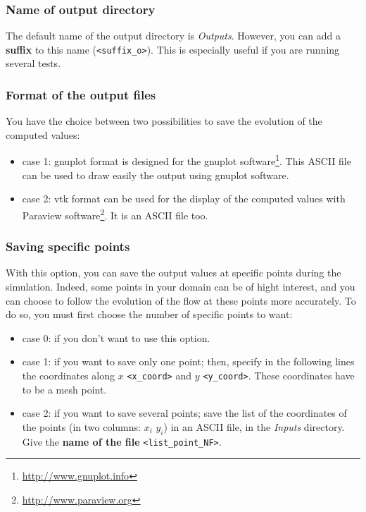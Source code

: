 \documentclass[a4paper, 11pt]{article}
\begin{document}
\subsubsection{Name of output directory}

The default name of the output directory is \textit{Outputs}. However, you can add a \textbf{suffix} to this name (\texttt{<suffix\_o>}). This is especially useful if you are running several tests.

\subsubsection{Format of the output files}
You have the choice between two possibilities to save the evolution of the computed values:
\begin{itemize}
\item case 1: gnuplot format is designed for the gnuplot software\footnote{\url{http://www.gnuplot.info}}. This ASCII file can be used to draw easily the output using gnuplot software.
\item case 2: vtk format can be used for the display of the computed values with Paraview software\footnote{\url{http://www.paraview.org}}. It is an ASCII file too.
\end{itemize}


\subsubsection{Saving specific points}
With this option, you can save the output values at specific points during the simulation. Indeed, 
some points in your domain can be of hight interest, and you can choose to follow the evolution of the flow at these points more accurately. 
To do so, you must first choose the number of specific points to want:
\begin{itemize}
\item case 0: if you don't want to use this option.  
\item case 1: if you want to save only one point; then, specify in the following lines the coordinates along $x$ \texttt{<x\_coord>} and $y$ \texttt{<y\_coord>}. These coordinates
 have to be a mesh point.
\item case 2: if you want to save several points; save the list of the coordinates of the points (in two columns: $x_i$ $y_i$) in an ASCII file, in the \textit{Inputs} directory. 
Give the \textbf{name of the file} \texttt{<list\_point\_NF>}.
\end{itemize}
\end{document}
